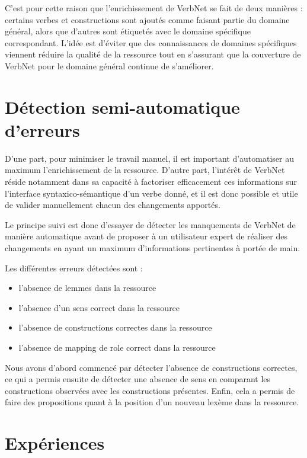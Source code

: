 C'est pour cette raison que l'enrichissement de VerbNet se fait de deux
manières : certains verbes et constructions sont ajoutés comme faisant partie
du domaine général, alors que d'autres sont étiquetés avec le domaine
spécifique correspondant. L'idée est d'éviter que des connaissances de domaines
spécifiques viennent réduire la qualité de la ressource tout en s'assurant que
la couverture de VerbNet pour le domaine général continue de s'améliorer.

\section{Détection semi-automatique d'erreurs}

D'une part, pour minimiser le travail manuel, il est important d'automatiser au
maximum l'enrichissement de la ressource. D'autre part, l'intérêt de VerbNet
réside notamment dans sa capacité à factoriser efficacement ces informations
sur l'interface syntaxico-sémantique d'un verbe donné, et il est donc possible
et utile de valider manuellement chacun des changements apportés.

Le principe suivi est donc d'essayer de détecter les manquements de VerbNet de
manière automatique avant de proposer à un utilisateur expert de réaliser des
changements en ayant un maximum d'informations pertinentes à portée de main.

Les différentes erreurs détectées sont :
\begin{itemize}
    \item l'absence de lemmes dans la ressource
    \item l'absence d'un sens correct dans la ressource
    \item l'absence de constructions correctes dans la ressource
    \item l'absence de mapping de role correct dans la ressource
\end{itemize}

Nous avons d'abord commencé par détecter l'absence de constructions correctes,
ce qui a permis ensuite de détecter une absence de sens en comparant les
constructions observées avec les constructions présentes. Enfin, cela a permis
de faire des propositions quant à la position d'un nouveau lexème dans la
ressource.

\section{Expériences}


